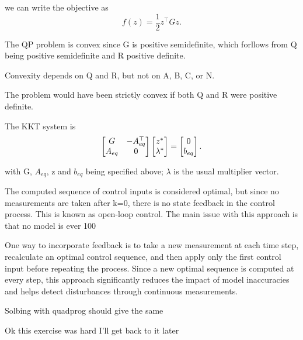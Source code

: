 we can write the objective as 
\[
  f(z) = \frac{1}{2}z^{\top}Gz
.\] 


The QP problem is convex since G is positive semidefinite, which forllows from Q being positive semidefinite and R positive definite. 

\medskip Convexity depends on Q and R, but not on A, B, C, or N. 

\medskip The problem would have been strictly convex if both Q and R were positive definite. 


The KKT system is
\[
  \begin{bmatrix} G & -A_{eq}^{\top} \\ A_{eq} & 0 \end{bmatrix}\begin{bmatrix} z^* \\ \lambda^* \end{bmatrix} = \begin{bmatrix} 0 \\ b_{eq} \end{bmatrix}
.\] 

with G, $A_{eq}$, z and $b_{eq}$ being specified above; $\lambda$ is the usual multiplier vector. 


The computed sequence of control inputs is considered optimal, but since no measurements are taken after 
k=0, there is no state feedback in the control process. This is known as open-loop control. The main issue with this approach is that no model is ever 100%

One way to incorporate feedback is to take a new measurement at each time step, recalculate an optimal control sequence, and then apply only the first control input before repeating the process. Since a new optimal sequence is computed at every step, this approach significantly reduces the impact of model inaccuracies and helps detect disturbances through continuous measurements.


Solbing with quadprog should give the same 


Ok this exercise was hard I'll get back to it later

